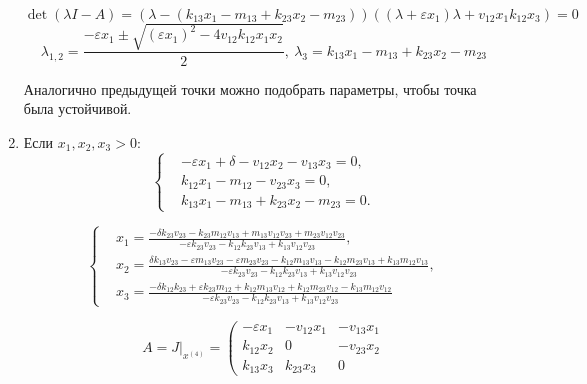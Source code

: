 \begin{enumerate}
            \[
                \det(\lambda I - A) = \left( \lambda - \left( k_{13} x_1 - m_{13} + k_{23} x_2 - m_{23} \right) \right) \left( (\lambda + \varepsilon x_1)\lambda + v_{12} x_1 k_{12} x_3 \right) = 0
            \]
            \[
                \lambda_{1,2} = \frac{-\varepsilon x_1 \pm \sqrt{ (\varepsilon x_1)^2 - 4 v_{12} k_{12} x_1 x_2 } }{2}, ~ 
                \lambda_3 = k_{13} x_1 - m_{13} + k_{23} x_2 - m_{23}
            \]

            Аналогично предыдущей точки можно подобрать параметры, чтобы точка была устойчивой.

        \item Если \( x_1, x_2, x_3 > 0 \):
            \[
                \left\{\begin{split}
                    & -\varepsilon x_1 + \delta - v_{12} x_2 - v_{13} x_3 = 0, \\
                    & k_{12} x_1 - m_{12} - v_{23} x_3 = 0, \\
                    & k_{13} x_1 - m_{13} + k_{23} x_2 - m_{23} = 0. 
                \end{split}\right.
            \]

            \[
                \left\{\begin{split}
                    & x_1 = \frac{-\delta k_{23} v_{23} - k_{23} m_{12} v_{13} + m_{13} v_{12} v_{23} + m_{23} v_{12} v_{23}}{-\varepsilon k_{23} v_{23} - k_{12} k_{23} v_{13} + k_{13} v_{12} v_{23}}, \\
                    & x_2 = \frac{\delta k_{13} v_{23} - \varepsilon m_{13} v_{23} - \varepsilon m_{23} v_{23} - k_{12} m_{13} v_{13} - k_{12} m_{23} v_{13} + k_{13} m_{12} v_{13}}{-\varepsilon k_{23} v_{23} - k_{12} k_{23} v_{13} + k_{13} v_{12} v_{23}}, \\
                    & x_3 = \frac{-\delta k_{12} k_{23} + \varepsilon k_{23} m_{12} + k_{12} m_{13} v_{12} + k_{12} m_{23} v_{12} - k_{13} m_{12} v_{12}}{-\varepsilon k_{23} v_{23} - k_{12} k_{23} v_{13} + k_{13} v_{12} v_{23}}
                \end{split}\right.
            \]

            \[
                A = J\big|_{x^{(4)}} = \left(
                    \begin{matrix}
                        -\varepsilon x_1 & -v_{12}  x_1  & -v_{13} x_1 \\
                        k_{12} x_2 & 0 & -v_{23} x_2 \\
                        k_{13} x_3 & k_{23} x_3 & 0


\end{matrix}\]
\end{enumerate}
